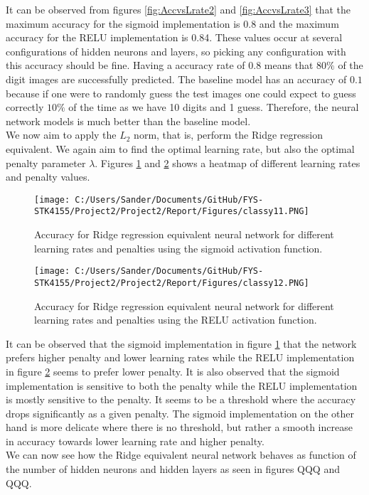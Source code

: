 \documentclass[12pt,a4paper]{article}
\begin{document}
\noindent It can be observed from figures \ref{fig:AccvsLrate2} and \ref{fig:AccvsLrate3} that the maximum accuracy for the sigmoid implementation is 0.8 and the maximum accuracy for the RELU implementation is 0.84. These values occur at several configurations of hidden neurons and layers, so picking any configuration with this accuracy should be fine. Having a accuracy rate of 0.8 means that $80\%$ of the digit images are successfully predicted. The baseline model has an accuracy of $0.1$ because if one were to randomly guess the test images one could expect to guess correctly $10\%$ of the time as we have 10 digits and 1 guess. Therefore, the neural network models is much better than the baseline model.
\\
We now aim to apply the $L_2$ norm, that is, perform the Ridge regression equivalent. We again aim to find the optimal learning rate, but also the optimal penalty parameter $\lambda$. Figures \ref{fig:AccvsLrate4} and \ref{fig:AccvsLrate5} shows a heatmap of different learning rates and penalty values.

\begin{figure}[H]
\centering
\texttt{[image: C:/Users/Sander/Documents/GitHub/FYS-STK4155/Project2/Project2/Report/Figures/classy11.PNG]}
\caption{\label{fig:AccvsLrate4} Accuracy for Ridge regression equivalent neural network for different learning rates and penalties using the sigmoid activation function.}
\end{figure}

\begin{figure}[H]
\centering
\texttt{[image: C:/Users/Sander/Documents/GitHub/FYS-STK4155/Project2/Project2/Report/Figures/classy12.PNG]}
\caption{\label{fig:AccvsLrate5} Accuracy for Ridge regression equivalent neural network for different learning rates and penalties using the RELU activation function.}
\end{figure}

\noindent It can be observed that the sigmoid implementation in figure \ref{fig:AccvsLrate4} that the network prefers higher penalty and lower learning rates while the RELU implementation in figure \ref{fig:AccvsLrate5} seems to prefer lower penalty. It is also observed that the sigmoid implementation is sensitive to both the penalty while the RELU implementation is mostly sensitive to the penalty. It seems to be a threshold where the accuracy drops significantly as a given penalty. The sigmoid implementation on the other hand is more delicate where there is no threshold, but rather a smooth increase in accuracy towards lower learning rate and higher penalty.
\\
We can now see how the Ridge equivalent neural network behaves as function of the number of hidden neurons and hidden layers as seen in figures QQQ and QQQ.
\end{document}
